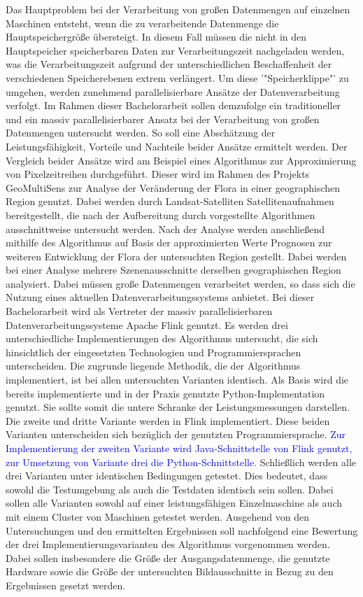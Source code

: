 \newline
Das Hauptproblem bei der Verarbeitung von großen Datenmengen auf einzelnen Maschinen entsteht, wenn die zu verarbeitende Datenmenge die Hauptspeichergröße übersteigt. In diesem Fall müssen die nicht in den Hauptspeicher speicherbaren Daten zur Verarbeitungszeit nachgeladen werden, was die Verarbeitungszeit aufgrund der unterschiedlichen Beschaffenheit der verschiedenen Speicherebenen extrem verlängert. Um diese '"Speicherklippe"' zu umgehen, werden zunehmend parallelisierbare Ansätze der Datenverarbeitung verfolgt.
Im Rahmen dieser Bachelorarbeit sollen demzufolge ein traditioneller und ein massiv parallelisierbarer Ansatz bei der Verarbeitung von großen Datenmengen untersucht werden. So soll eine Abschätzung der Leistungsfähigkeit, Vorteile und Nachteile beider Ansätze ermittelt werden. Der Vergleich beider Ansätze wird am Beispiel eines Algorithmus zur Approximierung von Pixelzeitreihen durchgeführt. Dieser wird im Rahmen des Projekts GeoMultiSens\cite{GeoMultiSensWebsite} zur Analyse der Veränderung der Flora in einer geographischen Region genutzt. Dabei werden durch Landsat-Satelliten Satellitenaufnahmen bereitgestellt, die nach der Aufbereitung durch vorgestellte Algorithmen ausschnittweise untersucht werden. Nach der Analyse werden anschließend mithilfe des Algorithmus auf Basis der approximierten Werte Prognosen zur weiteren Entwicklung der Flora der untersuchten Region gestellt. Dabei werden bei einer Analyse mehrere Szenenausschnitte derselben geographischen Region analysiert. Dabei müssen große Datenmengen verarbeitet werden, so dass sich die Nutzung eines aktuellen Datenverarbeitungssystems anbietet. Bei dieser Bachelorarbeit wird als Vertreter der massiv parallelisierbaren Datenverarbeitungssysteme Apache Flink genutzt.
\newline
Es werden drei unterschiedliche Implementierungen des Algorithmus untersucht, die sich hinsichtlich der eingesetzten Technologien und Programmiersprachen unterscheiden. Die zugrunde liegende Methodik, die der Algorithmus implementiert, ist bei allen untersuchten Varianten identisch. Als Basis wird die bereits implementierte und in der Praxis genutzte Python-Implementation genutzt. Sie sollte somit die untere Schranke der Leistungsmessungen darstellen. Die zweite und dritte Variante werden in Flink implementiert. Diese beiden Varianten unterscheiden sich bezüglich der genutzten Programmiersprache. \textcolor{blue}{Zur Implementierung der zweiten Variante wird Java-Schnittstelle von Flink genutzt, zur Umsetzung von Variante drei die Python-Schnittstelle.} Schließlich werden alle drei Varianten unter identischen Bedingungen getestet. Dies bedeutet, dass sowohl die Testumgebung als auch die Testdaten identisch sein sollen. Dabei sollen alle Varianten sowohl auf einer leistungsfähigen Einzelmaschine als auch mit einem Cluster von Maschinen getestet werden. Ausgehend von den Untersuchungen und den ermittelten Ergebnissen soll nachfolgend eine Bewertung der drei Implementierungsvarianten des Algorithmus vorgenommen werden. Dabei sollen insbesondere die Größe der Ausgangsdatenmenge, die genutzte Hardware sowie die Größe der untersuchten Bildausschnitte in Bezug zu den Ergebnissen gesetzt werden.

